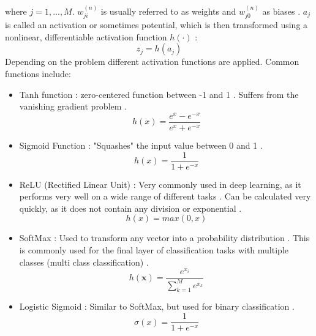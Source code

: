 \documentclass[draft,final,oneside]{vutinfth} %
\begin{document}
where $j = 1, ..., M$. $w_{ji}^{(n)}$ is usually referred to as weights and $w_{j0}^{(n)}$ as biases \cite{bishop}. $a_j$ is called an activation or sometimes potential, which is then transformed using a nonlinear, differentiable activation function $h(\cdot)$ \cite{bishop}:
\begin{equation}
z_j = h(a_j)
\end{equation}
Depending on the problem different activation functions are applied. Common functions include:
\begin{itemize}
\item Tanh function \cite{activationfunctions}: zero-centered function between -1 and 1 \cite{activationfunctions}. Suffers from the vanishing gradient problem \cite{activationfunctions}.
\begin{equation}
h(x) = \dfrac{e^x - e^{-x}}{e^x + e^{-x}}
\end{equation}
\item Sigmoid Function \cite{anintroductiontoneuralnetworks}: "Squashes" the input value between 0 and 1 \cite{anintroductiontoneuralnetworks}.
\begin{equation}
h(x) = \dfrac {1} {1 + e^{-x}}
\end{equation}
\item ReLU (Rectified Linear Unit) \cite{Goodfellow-et-al-2016}: Very commonly used in deep learning, as it performs very well on a wide range of different tasks \cite{activationfunctions}. Can be calculated very quickly, as it does not contain any division or exponential \cite{activationfunctions}.
\begin{equation}
h(x) = max(0, x)
\end{equation}
\item SoftMax \cite{Goodfellow-et-al-2016}: Used to transform any vector into a probability distribution \cite{activationfunctions}. This is commonly used for the final layer of classification tasks with multiple classes (multi class classification) \cite{activationfunctions}.
\begin{equation}
h(\boldsymbol{x}) = \dfrac{e^{x_i}}{\sum_{k=1}^{M} e^{x_k}}
\end{equation}
\item Logistic Sigmoid \cite{Goodfellow-et-al-2016}: Similar to SoftMax, but used for binary classification \cite{Goodfellow-et-al-2016}.
\begin{equation}
\sigma(x) = \dfrac{1}{1 + e^{-x}}
\end{equation}
\end{itemize}
\end{document}
